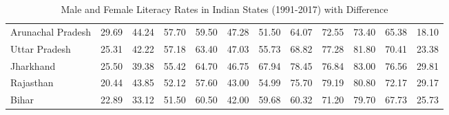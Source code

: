 \begin{table}[h]
\begin{tabular}{lccccccccccc}
        Arunachal Pradesh & 29.69 & 44.24 & 57.70 & 59.50 & 47.28 & 51.50 & 64.07 & 72.55 & 73.40 & 65.38 & 18.10 \\
        Uttar Pradesh   & 25.31 & 42.22 & 57.18 & 63.40 & 47.03 & 55.73 & 68.82 & 77.28 & 81.80 & 70.41 & 23.38 \\
        Jharkhand       & 25.50 & 39.38 & 55.42 & 64.70 & 46.75 & 67.94 & 78.45 & 76.84 & 83.00 & 76.56 & 29.81 \\
        Rajasthan       & 20.44 & 43.85 & 52.12 & 57.60 & 43.00 & 54.99 & 75.70 & 79.19 & 80.80 & 72.17 & 29.17 \\
        Bihar           & 22.89 & 33.12 & 51.50 & 60.50 & 42.00 & 59.68 & 60.32 & 71.20 & 79.70 & 67.73 & 25.73 \\
        \bottomrule
    \end{tabular}
    \caption{Male and Female Literacy Rates in Indian States (1991-2017) with Difference}
    \label{tab:combined_literacy_states_diff}
\end{table}


